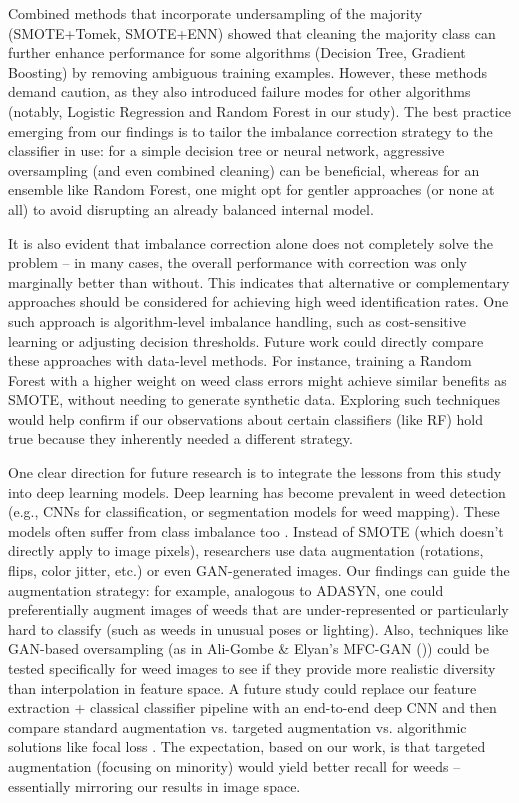 \documentclass[agriengineering,article,submit,pdftex,moreauthors]{Definitions/mdpi}
\begin{document}
Combined methods that incorporate undersampling of the majority (SMOTE+Tomek, SMOTE+ENN) showed that cleaning the majority class can further enhance performance for some algorithms (Decision Tree, Gradient Boosting) by removing ambiguous training examples. However, these methods demand caution, as they also introduced failure modes for other algorithms (notably, Logistic Regression and Random Forest in our study). The best practice emerging from our findings is to tailor the imbalance correction strategy to the classifier in use: for a simple decision tree or neural network, aggressive oversampling (and even combined cleaning) can be beneficial, whereas for an ensemble like Random Forest, one might opt for gentler approaches (or none at all) to avoid disrupting an already balanced internal model.

It is also evident that imbalance correction alone does not completely solve the problem – in many cases, the overall performance with correction was only marginally better than without. This indicates that alternative or complementary approaches should be considered for achieving high weed identification rates. One such approach is algorithm-level imbalance handling, such as cost-sensitive learning or adjusting decision thresholds. Future work could directly compare these approaches with data-level methods. For instance, training a Random Forest with a higher weight on weed class errors might achieve similar benefits as SMOTE, without needing to generate synthetic data. Exploring such techniques would help confirm if our observations about certain classifiers (like RF) hold true because they inherently needed a different strategy.

One clear direction for future research is to integrate the lessons from this study into deep learning models. Deep learning has become prevalent in weed detection (e.g., CNNs for classification, or segmentation models for weed mapping). These models often suffer from class imbalance too \cite{Nasiri2022-rj}. Instead of SMOTE (which doesn’t directly apply to image pixels), researchers use data augmentation (rotations, flips, color jitter, etc.) or even GAN-generated images. Our findings can guide the augmentation strategy: for example, analogous to ADASYN, one could preferentially augment images of weeds that are under-represented or particularly hard to classify (such as weeds in unusual poses or lighting). Also, techniques like GAN-based oversampling (as in Ali-Gombe \& Elyan’s MFC-GAN (\cite{Ali-Gombe2019-kr})) could be tested specifically for weed images to see if they provide more realistic diversity than interpolation in feature space. A future study could replace our feature extraction + classical classifier pipeline with an end-to-end deep CNN and then compare standard augmentation vs. targeted augmentation vs. algorithmic solutions like focal loss \cite{Brems2025-yg}. The expectation, based on our work, is that targeted augmentation (focusing on minority) would yield better recall for weeds – essentially mirroring our results in image space.
\end{document}
